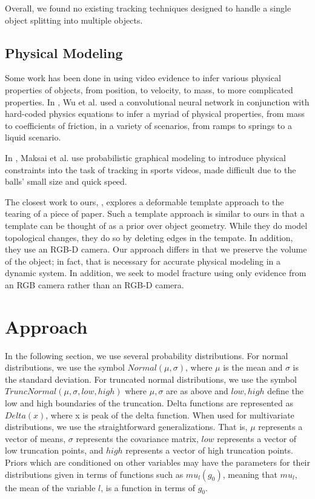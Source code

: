 \documentclass[runningheads]{llncs}
\begin{document}
Overall, we found no existing tracking techniques designed to handle a single 
object splitting into multiple objects.

\subsection{Physical Modeling}

Some work has been done in using video evidence to infer various physical 
properties of objects, from position, to velocity, to mass, to more complicated 
properties. In \cite{wu2016physics}, Wu et al. used a convolutional neural network in conjunction with 
hard-coded physics equations to infer a myriad of physical properties, from mass 
to coefficients of friction, in a variety of scenarios, from ramps to springs to 
a liquid scenario.

In \cite{maksai2016players}, Maksai et al. use probabilistic graphical modeling to introduce physical 
constraints into the task of tracking in sports videos, made difficult due to 
the balls’ small size and quick speed.

The closest work to ours, \cite{tsoli2016tracking}, explores a deformable template 
approach to the tearing of a piece of paper. Such a template approach is similar 
to ours in that a template can be thought of as a prior over object geometry. 
While they do model topological changes, they do so by deleting edges in the 
tempate. In addition, they use an RGB-D camera. Our approach differs in that 
we preserve the volume of the object; in fact, that is necessary for accurate 
physical modeling in a dynamic system. In addition, we seek to model fracture using only evidence 
from an RGB camera rather than an RGB-D camera.

\section{Approach}
\label{approach}

In the following section, we use 
several probability distributions. For normal distributions, we use the symbol 
$Normal(\mu, \sigma)$, where $\mu$ is the mean and $\sigma$ is the standard 
deviation. For truncated normal distributions, we use the symbol $TruncNormal(\mu, \sigma, low, high)$
where $\mu, \sigma$ are as above and $low, high$ define the low and high 
boundaries of the truncation. Delta functions are represented as $Delta(x)$, 
where x is peak of the delta function. When used for multivariate distributions, we use 
the straightforward generalizations. That is, $\mu$ represents a vector of 
means, $\sigma$ represents the covariance matrix, $low$ represents a vector of 
low truncation points, and $high$ represents a vector of high truncation points. 
Priors which are conditioned on other variables may have the parameters for their 
distributions given in terms of functions such as $mu_{l}(g_0)$, 
meaning that $mu_{l}$, the mean of the variable $l$, is a function in terms of $g_0$.
\end{document}
